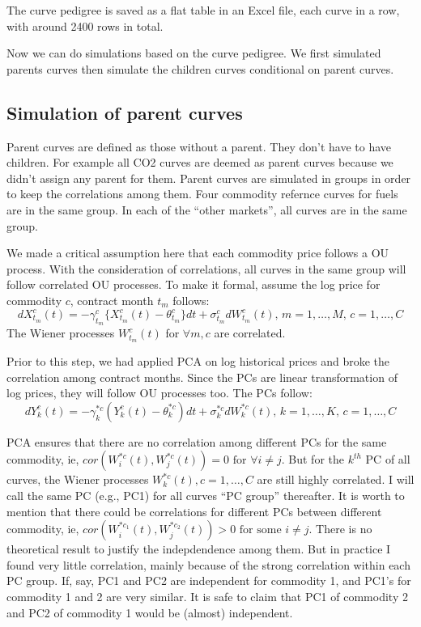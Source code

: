 \documentclass[12pt]{article}
\begin{document}
The curve pedigree is saved as a flat table in an Excel
file, each curve in a row, with around 2400 rows in total.

Now we can do simulations based on the curve pedigree.
We first simulated parents curves then simulate the children
curves conditional on parent curves. 

\subsection{Simulation of parent curves}

Parent curves are defined as 
those without a parent. They don't have to have children. 
For example all CO2 curves are deemed as parent curves
because we didn't assign any parent for them. Parent curves
are simulated in groups in order to keep the correlations
among them. Four commodity refernce curves for
fuels are in the same group. In each of the 
``other markets'', all curves are in the same group. 

We made a critical assumption here that each commodity price 
follows a OU process. With the consideration
of correlations, all curves in the same group 
will  follow correlated 
OU processes. To make it formal, assume
the log price for commodity $c$, contract month $t_m$
follows:
\[dX_{t_m}^c(t) = -\gamma_{t_m}^c \{X_{t_m}^c(t)-\theta_{t_m}^c\}dt 
+ \sigma_{t_m}^c dW_{t_m}^c(t) \mbox{, }  m=1, \ldots, M
\mbox{, } c=1, \ldots, C \]
The Wiener processes $W_{t_m}^c(t)$ for $\forall m, c$
are correlated.

Prior to this step, 
we had applied PCA on log historical prices and broke the correlation
among contract months. Since the PCs are linear transformation of 
log prices, they
will follow OU processes too.
The PCs follow: 
\[dY_{k}^c(t) = -\gamma_{k}^{*c} (Y_{k}^c(t)-\theta_{k}^{*c})dt 
+ \sigma_{k}^{*c} dW_{k}^{*c}(t)\mbox{, }  k=1, \ldots, K
\mbox{, } c=1, \ldots, C \] 

PCA ensures that there are no correlation among 
different PCs for the same commodity, ie, 
$cor(W_{i}^{*c}(t),W_{j}^{*c}(t))=0 \mbox{ for } \forall i\ne j$.
But for the $k^{th}$ PC of all curves, the Wiener processes 
$W_{k}^{*c}(t), c=1,\ldots,C$
are still highly correlated. I will call the same PC (e.g., PC1) for 
all curves ``PC group'' thereafter.
It is worth to mention that there could be correlations
for different PCs between different commodity, ie,
$cor(W_{i}^{*c_1}(t), W_{j}^{*c_2}(t))>0 \mbox{ for some } i\ne j$.
There is no theoretical result to justify the 
indepdendence among them. 
But in practice I found very little correlation, 
mainly because of the strong correlation within each 
PC group. If, say, PC1 and PC2 are independent for commodity 1,
and PC1's for commodity 1 and 2 are very similar.
It is safe to claim that PC1 of commodity 2 and PC2 of 
commodity 1 would be (almost) independent. 
\end{document}
